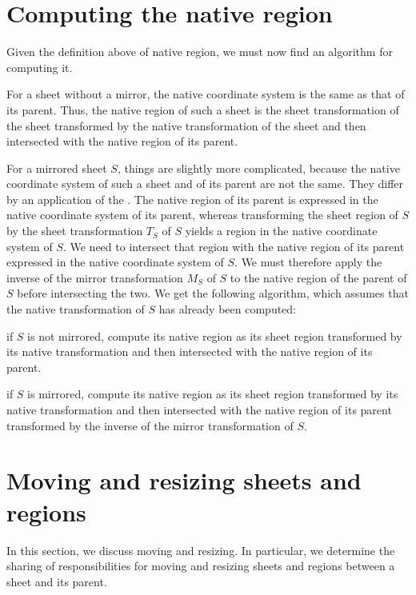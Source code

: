 \section{Computing the native region}

Given the definition above of native region, we must now find an
algorithm for computing it.  

For a sheet without a mirror, the native coordinate system is the same
as that of its parent.  Thus, the native region of such a sheet is the
sheet transformation of the sheet transformed by the native
transformation of the sheet and then intersected with the native
region of its parent. 

For a mirrored sheet $S$, things are slightly more complicated,
because the native coordinate system of such a sheet and of its parent
are not the same.  They differ by an application of the .  The native region of its parent is expressed in the
native coordinate system of its parent, whereas transforming the sheet
region of $S$ by the sheet transformation $T_S$ of $S$ yields a region
in the native coordinate system of $S$.  We need to intersect that
region with the native region of its parent expressed in the native
coordinate system of $S$.  We must therefore apply the inverse of the
mirror transformation $M_S$ of $S$ to the native region of the parent
of $S$ before intersecting the two.   We get the following algorithm,
which assumes that the native transformation of $S$ has already been
computed: 

\begin{enumerate0}
\item if $S$ is not mirrored, compute its native region as its sheet
region transformed by its native transformation and then intersected
with the native region of its parent.
\item if $S$ is mirrored, compute its native region as its sheet
region transformed by its native transformation and then intersected
with the native region of its parent transformed by the inverse of the
mirror transformation of $S$.
\end{enumerate0}

\section{Moving and resizing sheets and regions}
\label{secmoving}

In this section, we discuss moving and resizing.  In particular, we
determine the sharing of responsibilities for moving and resizing
sheets and regions between a sheet and its parent. 

